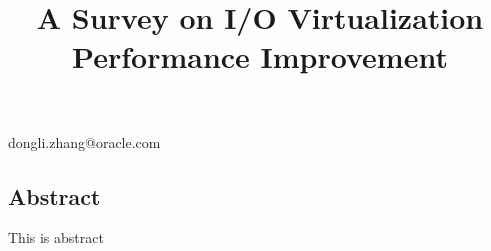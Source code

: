 \documentclass[10pt,reprint]{socc14}
\begin{document}
\date{}

\title{A Survey on I/O Virtualization Performance Improvement}
\subtitle{}


           {}
		   {dongli.zhang@oracle.com}

\maketitle
%
%

\subsection*{Abstract}
This is abstract





\end{document}
